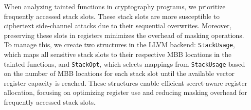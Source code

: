 
When analyzing tainted functions in cryptography programs, we prioritize frequently accessed stack slots. 
These stack slots are more susceptible to ciphertext side-channel attacks due to their sequential overwrites. Moreover, preserving these slots in registers minimizes the overhead of masking operations. 
To manage this, we create two structures in the LLVM backend: \texttt{StackUsage}, which maps all sensitive stack slots to their respective MBB locations in the tainted functions, and \texttt{StackOpt}, which selects mappings from \texttt{StackUsage} based on the number of MBB locations for each stack slot until the available vector register capacity is reached. 
These structures enable efficient secret-aware register allocation, focusing on optimizing register use and reducing masking overhead for frequently accessed stack slots.

